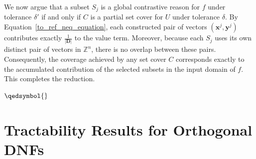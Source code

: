 \documentclass{article}
\newcommand{\x}{\textbf{x}}
\newcommand{\y}{\textbf{y}}
\begin{document}
We now argue that a subset $S_j$ is a global contrastive reason for $f$ under tolerance $\delta'$ if and only if $C$ is a partial set cover for $U$ under tolerance $\delta$. By Equation~\ref{to_ref_neq_equation}, each constructed pair of vectors $(\x^j, \y^j)$ contributes exactly $\frac{1}{|\mathbf{D}|}$ to the value term. Moreover, because each $S_j$ uses its own distinct pair of vectors in $\mathbb{Z}^n$, there is no overlap between these pairs. Consequently, the coverage achieved by any set cover $C$ corresponds exactly to the accumulated contribution of the selected subsets in the input domain of $f$. This completes the reduction.




$\qedsymbol{}$








\section{Tractability Results for Orthogonal DNFs} \label{app:odnf}
\end{document}
